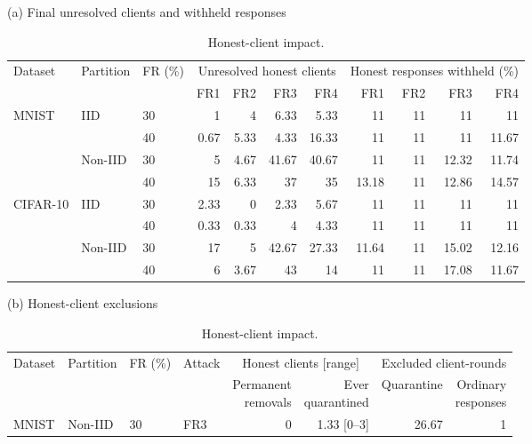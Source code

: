 \documentclass[conference]{IEEEtran}
\begin{document}
\begin{table}[!tp]
\centering\footnotesize\setlength{\tabcolsep}{5pt}
\caption{Honest-client impact.}\label{tab:safety}
(a) Final unresolved clients and withheld responses\par\smallskip
\begin{tabular}{lllrrrrrrrr}
\toprule
\multirow{2}{*}{Dataset} & \multirow{2}{*}{Partition} & \multirow{2}{*}{FR (\%)} & \multicolumn{4}{c}{Unresolved honest clients} & \multicolumn{4}{c}{Honest responses withheld (\%)} \\
\cmidrule(lr){4-7}\cmidrule(lr){8-11}
& & & FR1 & FR2 & FR3 & FR4 & FR1 & FR2 & FR3 & FR4 \\
\midrule
\multirow{4}{*}{MNIST} & \multirow{2}{*}{IID} & 30 & 1 & 4 & 6.33 & 5.33 & 11 & 11 & 11 & 11 \\
 &  & 40 & 0.67 & 5.33 & 4.33 & 16.33 & 11 & 11 & 11 & 11.67 \\
\cmidrule(lr){2-11}
 & \multirow{2}{*}{Non-IID} & 30 & 5 & 4.67 & 41.67 & 40.67 & 11 & 11 & 12.32 & 11.74 \\
 &  & 40 & 15 & 6.33 & 37 & 35 & 13.18 & 11 & 12.86 & 14.57 \\
\midrule
\multirow{4}{*}{CIFAR-10} & \multirow{2}{*}{IID} & 30 & 2.33 & 0 & 2.33 & 5.67 & 11 & 11 & 11 & 11 \\
 &  & 40 & 0.33 & 0.33 & 4 & 4.33 & 11 & 11 & 11 & 11 \\
\cmidrule(lr){2-11}
 & \multirow{2}{*}{Non-IID} & 30 & 17 & 5 & 42.67 & 27.33 & 11.64 & 11 & 15.02 & 12.16 \\
 &  & 40 & 6 & 3.67 & 43 & 14 & 11 & 11 & 17.08 & 11.67 \\
\bottomrule
\end{tabular}
\par\medskip
(b) Honest-client exclusions\par\smallskip
\begin{tabular}{llllrrrr}
\toprule
\multirow{2}{*}{Dataset} & \multirow{2}{*}{Partition} & \multirow{2}{*}{FR (\%)} & \multirow{2}{*}{Attack} & \multicolumn{2}{c}{Honest clients [range]} & \multicolumn{2}{c}{Excluded client-rounds} \\
\cmidrule(lr){5-6}\cmidrule(lr){7-8}
& & & & \shortstack{Permanent\\removals} & \shortstack{Ever\\quarantined} & Quarantine & \shortstack{Ordinary\\responses} \\
\midrule
\multirow{3}{*}{MNIST} & \multirow{3}{*}{Non-IID} & 30 & FR3 & 0 & 1.33 [0--3] & 26.67 & 1 \\

\end{tabular}
\end{table}
\end{document}
